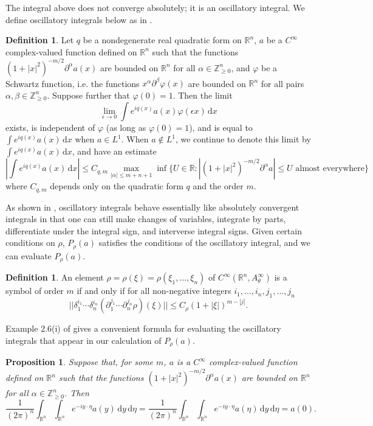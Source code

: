 \documentclass[10pt]{article}
\newtheorem{prop}[thm]{Proposition}
\theoremstyle{remark}
\theoremstyle{definition}
\newtheorem{define}[thm]{Definition}
\begin{document}
The integral above does not converge absolutely; it is an oscillatory integral.
We define oscillatory integrals below as in \cite{raymond}.
\begin{define}
Let $q$ be a nondegenerate real quadratic form on $\mathbb R^n$,
$a$ be a $C^{\infty}$ complex-valued function
defined on $\mathbb R^n$ such that the functions
$(1+|x|^2)^{-m/2}\partial^{\alpha}a(x)$ are bounded on $\mathbb R^n$
for all $\alpha\in\mathbb Z_{\ge 0}^n$, and $\varphi$ be a Schwartz function,
i.e. the functions $x^{\alpha}\partial^{\beta}\varphi(x)$ are bounded on
$\mathbb R^n$ for all pairs $\alpha,\beta\in\mathbb Z_{\ge 0}^n$. Suppose
further that $\varphi(0)=1$. Then the limit
$$\lim_{\epsilon\rightarrow 0}
\int\!e^{iq(x)}a(x)\varphi(\epsilon x)\,\mathrm dx$$
exists, is independent of $\varphi$ (as long as $\varphi(0)=1$), and is
equal to $\int\!e^{iq(x)}a(x)\,\mathrm dx$ when $a\in L^1$. When $a\not\in L^1$,
we continue to denote this limit by $\int\!e^{iq(x)}a(x)\,\mathrm dx$,
and have an estimate
$$\left|\int\!e^{iq(x)}a(x)\,\mathrm dx\right|
\le C_{q,m}\max_{|\alpha|\le m+n+1}\inf\{U\in\mathbb R:
|(1+|x|^2)^{-m/2}\partial^{\alpha}a|\le U\text{ almost everywhere}\}$$
where $C_{q,m}$ depends only on the quadratic form $q$ and the order $m$.
\end{define}
As shown in \cite{raymond}, oscillatory integrals behave essentially like
absolutely convergent integrals in that one can still make changes of
variables, integrate by parts, differentiate under the integral sign, and
interverse integral signs. Given certain conditions on $\rho$, $P_{\rho}(a)$
satisfies the conditions of the oscillatory integral, and we can evaluate
$P_{\rho}(a)$.
\begin{define}
An element $\rho=\rho(\xi)=\rho(\xi_1,\ldots,\xi_n)$ of
$C^{\infty}(\mathbb R^n,A_{\theta}^{\infty})$ is a symbol of order $m$ if and
only if for all non-negative integers $i_1,\ldots,i_n,j_1,\ldots,j_n$
$$||\delta_1^{i_1}\cdots\delta_n^{i_n}(\partial_1^{j_1}\cdots\partial_n^{j_n}
\rho)(\xi)||\le C_{\rho}(1+|\xi|)^{m-|j|}.$$
\end{define}
Example 2.6(i) of \cite{raymond} gives a convenient formula for evaluating
the oscillatory integrals that appear in our calculation of $P_{\rho}(a)$.
\begin{prop}\label{osc}
Suppose that, for some $m$, $a$ is a $C^{\infty}$ complex-valued function
defined on $\mathbb R^n$ such that the functions
$(1+|x|^2)^{-m/2}\partial^{\alpha}a(x)$ are bounded on $\mathbb R^n$
for all $\alpha\in\mathbb Z_{\ge 0}^n$.
Then
$$\frac{1}{(2\pi)^n}\int_{\mathbb R^n}\!\int_{\mathbb R^n}\!
e^{-iy\cdot\eta}a(y)\,\mathrm dy\,\mathrm d\eta
=\frac{1}{(2\pi)^n}\int_{\mathbb R^n}\!\int_{\mathbb R^n}\!
e^{-iy\cdot\eta}a(\eta)\,\mathrm dy\,\mathrm d\eta
=a(0).$$
\end{prop}
\end{document}
